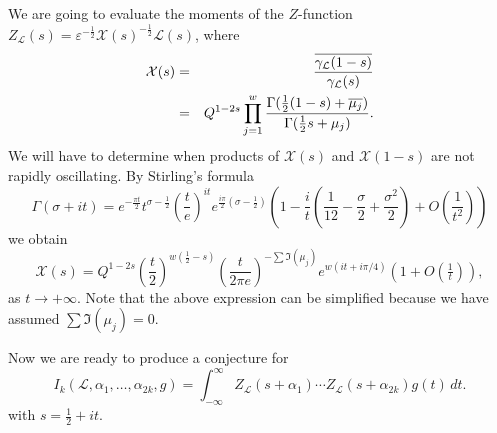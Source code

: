 \documentclass[12pt,letterpaper]{amsart}
\theoremstyle{plain}
\theoremstyle{definition}
\theoremstyle{remark}
\numberwithin{equation}{subsection}
\numberwithin{theorem}{subsection}
\numberwithin{table}{subsection}
\def\({\left(}
\def\){\right)}
\begin{document}
We are going to evaluate the moments
of the $Z$-function $Z_\mathcal{L}(s) = 
\varepsilon^{-\frac12}\mathcal{X}(s)^{-\frac12} \mathcal{L}(s)$,
where
\begin{eqnarray}
\mathcal{X}(s) &=&
\frac{\overline{\gamma_{\mathcal{L}}(1-s)}}{\gamma_{\mathcal{L}}(s)} \cr
&=& Q^{1-2s} \prod_{j=1}^w \frac{ \Gamma(\tfrac12 (1-s)+ \overline{\mu_j})}
{ \Gamma(\tfrac12 s+ \mu_j)} .
\end{eqnarray}
We will have to determine when products of $\mathcal{X}(s)$ and
$\mathcal{X}(1-s)$ are not rapidly oscillating.  By Stirling's formula
\begin{equation}
\Gamma(\sigma+it) =
e^{-\frac{\pi t}{2}}t^{\sigma-\frac12}\(\frac {t}{e}\)^{it}
e^{\frac{i\pi}{2}(\sigma-\frac12)}
\( 1-\frac{i}{t}\(\frac{1}{12}-\frac{\sigma}{2}+\frac{\sigma^2}{2}\)+
O\(\frac{1}{t^2}\)\)
\end{equation}
we obtain
\begin{equation}\label{eqn:Xs}
\mathcal{X}(s)=Q^{1-2s} \(\frac{t}{2}\)^{w(\frac12 -s)}
\(\frac{t}{2\pi e}\)^{-\sum \Im(\mu_j)}
e^{w(it+i \pi /4)}(1+O(\tfrac{1}{t})),
\end{equation}
as $t\to +\infty$.
Note that the above expression can be simplified
because we have assumed $\sum \Im(\mu_j)=0$.

Now we are ready to produce a conjecture for
\begin{equation}\label{eqn:generalIk}
I_k(\mathcal{L},\alpha_1,\dots, \alpha_{2k},g)=
\int_{-\infty}^{\infty}  Z_\mathcal{L}(s+\alpha_1)\cdots
Z_\mathcal{L}(s+\alpha_{2k})g(t)\,dt.
\end{equation}
with $s=\frac12 +it$.  
\end{document}
